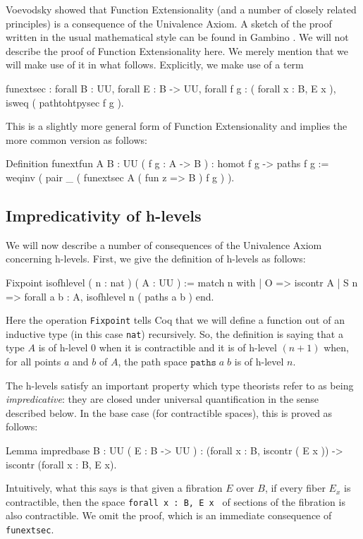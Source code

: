 Voevodsky \cite{Vo2012a} showed that Function Extensionality (and a
number of closely related principles) is a consequence of the
Univalence Axiom.  A sketch of the proof written in the usual
mathematical style can be found in Gambino \cite{Gambino:OR}.  We will
not describe the proof of Function Extensionality here.  We merely
mention that we will make use of it in what follows.  Explicitly, we
make use of a term 
\begin{center}
  \begin{coqcode}
funextsec : forall B : UU, forall E : B -> UU, 
 forall f g : ( forall x : B, E x ), 
  isweq ( pathtohtpysec f g ).
  \end{coqcode}
\end{center}
This is a slightly more general form of Function Extensionality and
implies the more common version as follows:
\begin{center}
  \begin{coqcode}
Definition funextfun { A B : UU } ( f g : A -> B ) : 
homot f g -> paths f g 
 := weqinv ( pair _ ( funextsec A ( fun z => B ) f g ) ).
  \end{coqcode}
\end{center}

\subsection{Impredicativity of h-levels}

We will now describe a number of consequences of the Univalence Axiom
concerning h-levels.  First, we give the definition of h-levels as follows:
\begin{center}
  \begin{coqcode}
Fixpoint isofhlevel ( n : nat ) ( A : UU ) := 
  match n with
    | O => iscontr A 
    | S n => forall a b : A, isofhlevel n ( paths a b )
  end.
  \end{coqcode}
\end{center}
Here the operation \verb|Fixpoint| tells Coq that we will define
a function out of an inductive type (in this case \verb|nat|)
recursively.  So, the definition is saying that a type $A$ is of
h-level 0 when it is contractible and it is of h-level $(n+1)$ when,
for all points $a$ and $b$ of $A$, the path space
$\texttt{paths}\;a\;b$ is of h-level $n$.

The h-levels satisfy an important property which type theorists refer
to as being \emph{impredicative}: they are closed under universal
quantification in the sense described below.  In the base case (for contractible
spaces), this is proved as follows:
\begin{center}
  \begin{coqcode}
Lemma impredbase { B : UU } ( E : B -> UU ) : 
(forall x : B, iscontr ( E x )) -> iscontr (forall x : B, E x).
  \end{coqcode}
\end{center}
Intuitively, what this says is that given a fibration $E$ over $B$, if
every fiber $E_{x}$ is contractible, then the space 
\verb|forall x : B, E x | of sections of the fibration is also
contractible.  We omit the proof, which is an immediate consequence of
\verb|funextsec|.

